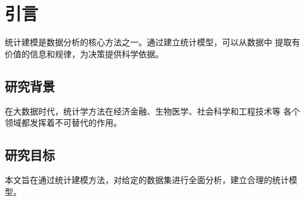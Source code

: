 \section{引言}


统计建模是数据分析的核心方法之一。通过建立统计模型，可以从数据中
提取有价值的信息和规律，为决策提供科学依据。

\subsection{研究背景}
在大数据时代，统计学方法在经济金融、生物医学、社会科学和工程技术等
各个领域都发挥着不可替代的作用。

\subsection{研究目标}
本文旨在通过统计建模方法，对给定的数据集进行全面分析，建立合理的统计模型。

